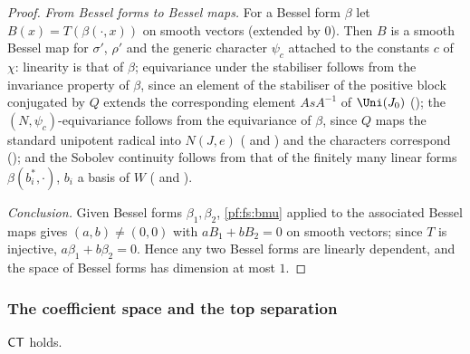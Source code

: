 \begin{proof}
\emph{From Bessel forms to Bessel maps.} For a Bessel form $\beta$ let $B(x)=T(\beta(\cdot,x))$ on smooth vectors (extended by $0$).
Then $B$ is a smooth Bessel map for $\sigma'$, $\rho'$ and the generic character $\psi_c$ attached to the constants $c$ of $\chi$:
linearity is that of $\beta$; equivariance under the stabiliser follows from the invariance property of $\beta$, since an element of the
stabiliser of the positive block conjugated by $Q$ extends the corresponding element $AsA^{-1}$ of $\Uni(J_0)$
(); the $(N,\psi_c)$-equivariance follows from the equivariance of
$\beta$, since $Q$ maps the standard unipotent radical into $N(J,e)$
( and )
and the characters correspond (); and the Sobolev continuity follows from that of the
finitely many linear forms $\beta(b_i^*,\cdot)$, $b_i$ a basis of $W$
( and ).

\emph{Conclusion.} Given Bessel forms $\beta_1,\beta_2$, \cref{pf:fs:bmu} applied to the associated Bessel maps gives $(a,b)\ne(0,0)$ with
$aB_1+bB_2=0$ on smooth vectors; since $T$ is injective, $a\beta_1+b\beta_2=0$. Hence any two Bessel forms are linearly dependent, and the
space of Bessel forms has dimension at most $1$.
\end{proof}

\subsubsection{The coefficient space and the top separation}

\begin{proposition}\label{pf:fs:coefTensor}
$\mathsf{CT}$ holds.
\end{proposition}

